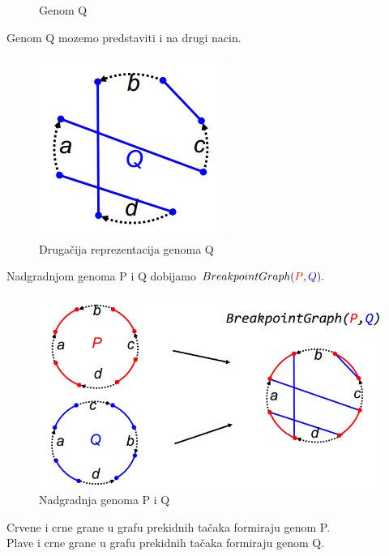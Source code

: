 \begin{figure}[h!]
  \caption{Genom Q}
\endminipage\hfill
\end{figure}

Genom {\color{blue}Q} mozemo predstaviti i na drugi nacin.
\begin{figure}[h!]
\centering
\includegraphics[scale=0.75]{poglavlja/6/slike/Q2.PNG}
\caption{Drugačija reprezentacija genoma Q}
\label{slika:X}
\end{figure}

\newpage
\noindent Nadgradnjom genoma {\color{red}P} i {\color{blue}Q} dobijamo $BreakpointGraph({\color{red}P}, {\color{blue}Q}).$
\begin{figure}[h]
\includegraphics[scale=0.7]{poglavlja/6/slike/breakpointgraph.PNG}
\caption{Nadgradnja genoma P i Q}
\label{slika:X}
\end{figure}

{\color{red} Crvene} i crne grane u grafu prekidnih tačaka formiraju genom P.\\

{\color{blue} Plave} i crne grane u grafu prekidnih tačaka  formiraju genom Q.\\

